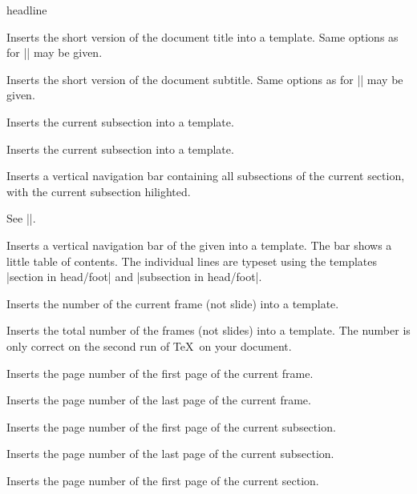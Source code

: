 \begin{element}{headline}
\begin{itemize}
    \iteminsert{\insertshorttitle}
    Inserts the short version of the document title into a template. Same
    options as for |\insertshortauthor| may be given.

    \iteminsert{\insertshortsubtitle}
    Inserts the short version of the document subtitle. Same
    options as for |\insertshortauthor| may be given.

    \iteminsert{\insertsubsection}
    Inserts the current subsection into a template.

    \iteminsert{\insertsubsubsection}
    Inserts the current subsection into a template.

    \iteminsert{\insertsubsectionnavigation}
    Inserts a vertical navigation bar containing all subsections of the
    current section, with the current subsection hilighted.

    \iteminsert{\insertsubsectionnavigationhorizontal}

    See |\insertsectionnavigationhorizontal|.

    \iteminsert{\insertverticalnavigation}
    Inserts a vertical navigation bar of the given  into a
    template. The bar shows a little table of contents. The individual
    lines are typeset using the templates
    |section in head/foot| and |subsection in head/foot|.

    \iteminsert{\insertframenumber}
    Inserts the number of the current frame (not slide) into a template.

    \iteminsert{\inserttotalframenumber}
    Inserts the total number of the frames (not slides) into a
    template. The number is only correct on the second run of \TeX\ on
    your document.

    \iteminsert{\insertframestartpage}
    Inserts the page number of the first page of the current frame.

    \iteminsert{\insertframeendpage}
    Inserts the page number of the last page of the current frame.

    \iteminsert{\insertsubsectionstartpage}
    Inserts the page number of the first page of the current subsection.

    \iteminsert{\insertsubsectionendpage}
    Inserts the page number of the last page of the current subsection.

    \iteminsert{\insertsectionstartpage}
    Inserts the page number of the first page of the current section.


\end{itemize}
\end{element}
